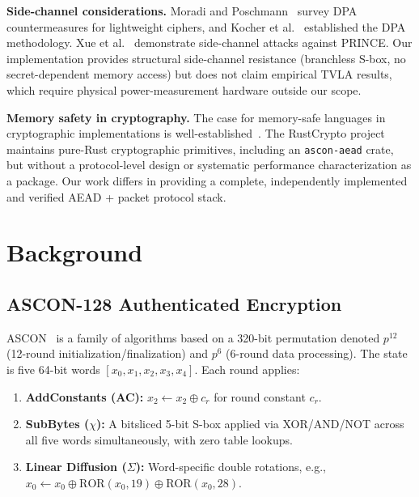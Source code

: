 \documentclass[conference]{IEEEtran}
\begin{document}
\textbf{Side-channel considerations.}
Moradi and Poschmann~\cite{b13} survey DPA countermeasures for lightweight
ciphers, and Kocher et al.~\cite{b15} established the DPA methodology. Xue
et al.~\cite{b14} demonstrate side-channel attacks against PRINCE. Our
implementation provides structural side-channel resistance (branchless S-box,
no secret-dependent memory access) but does not claim empirical TVLA results,
which require physical power-measurement hardware outside our scope.

\textbf{Memory safety in cryptography.}
The case for memory-safe languages in cryptographic implementations is
well-established~\cite{b16}. The RustCrypto project~\cite{b17} maintains
pure-Rust cryptographic primitives, including an \texttt{ascon-aead} crate,
but without a protocol-level design or systematic performance characterization
as a package. Our work differs in providing a complete, independently
implemented and verified AEAD + packet protocol stack.

\section{Background}
\label{sec:background}

\subsection{ASCON-128 Authenticated Encryption}

ASCON~\cite{b9} is a family of algorithms based on a 320-bit permutation
denoted $p^{12}$ (12-round initialization/finalization) and $p^{6}$
(6-round data processing). The state is five 64-bit words
$[x_0, x_1, x_2, x_3, x_4]$. Each round applies:
\begin{enumerate}
  \item \textbf{AddConstants (AC):} $x_2 \leftarrow x_2 \oplus c_r$ for
        round constant $c_r$.
  \item \textbf{SubBytes ($\chi$):} A bitsliced 5-bit S-box applied via
        XOR/AND/NOT across all five words simultaneously, with zero table lookups.
  \item \textbf{Linear Diffusion ($\Sigma$):} Word-specific double rotations, e.g.,
        $x_0 \leftarrow x_0 \oplus \mathrm{ROR}(x_0, 19) \oplus \mathrm{ROR}(x_0, 28)$.
\end{enumerate}
\end{document}
